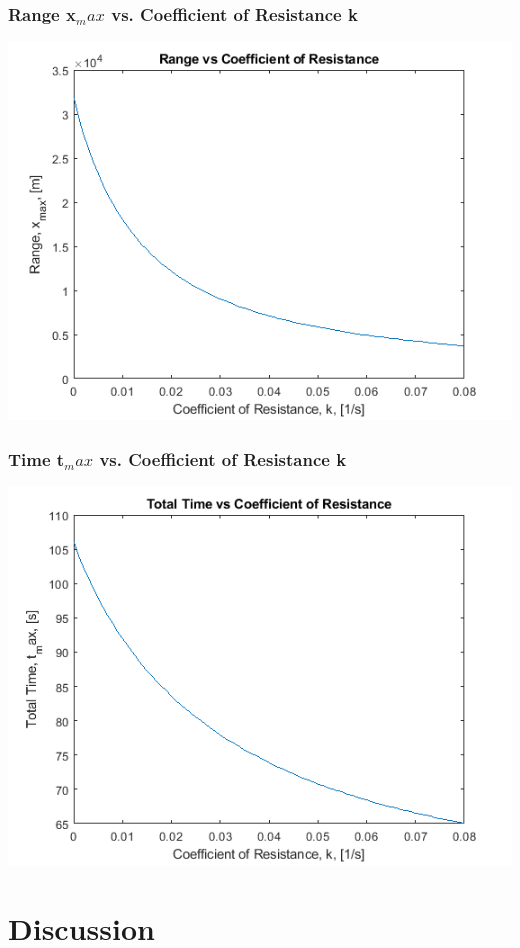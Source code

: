 \documentclass[oneside]{article}
\begin{document}
\subsubsection{Range x$_max$ vs. Coefficient of Resistance k}
\includegraphics [width=\linewidth]{graph_x-k.png}
\subsubsection{Time t$_max$ vs. Coefficient of Resistance k}
\includegraphics [width=\linewidth]{graph_t-k.png}


\newpage
\section{Discussion}
\end{document}
